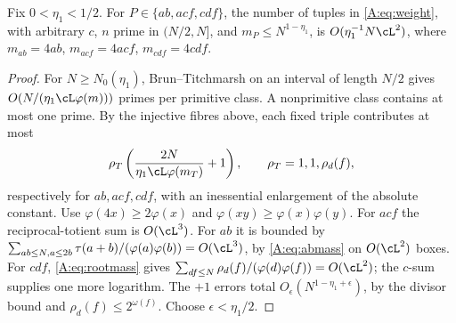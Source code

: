\begin{lemma}\label{L:8.2}
Fix $0<\eta_1<1/2$. For $P\in\{ab,acf,cdf\}$, the number of tuples
in \eqref{A:eq:weight}, with arbitrary $c$, $n$ prime in $(N/2,N]$, and
$m_P\le N^{1-\eta_1}$, is $O(\eta_1^{-1}N\cL^2)$, where
$m_{ab}=4ab$, $m_{acf}=4acf$, $m_{cdf}=4cdf$.
\end{lemma}
\begin{proof}
For $N\ge N_0(\eta_1)$, Brun--Titchmarsh \cite{MV} on an interval of
length $N/2$ gives $O(N/(\eta_1\cL\varphi(m)))$ primes per primitive
class. A nonprimitive class contains at most one prime. By the injective
fibres above, each fixed triple contributes at most
\[
 \rho_T\left(\frac{2N}{\eta_1\cL\varphi(m_T)}+1\right),
 \qquad \rho_T=1,1,\rho_d(f),
\]
respectively for $ab,acf,cdf$, with an inessential enlargement of the
absolute constant. Use $\varphi(4x)\ge2\varphi(x)$ and
$\varphi(xy)\ge\varphi(x)\varphi(y)$.
For $acf$ the reciprocal-totient sum is $O(\cL^3)$.
For $ab$ it is bounded by
$\sum_{ab\le N,a\le2b}\tau(a+b)/(\varphi(a)\varphi(b))=O(\cL^3)$,
by \eqref{A:eq:abmass} on $O(\cL^2)$ boxes.
For $cdf$, \eqref{A:eq:rootmass} gives
$\sum_{df\le N}\rho_d(f)/(\varphi(d)\varphi(f))=O(\cL^2)$;
the $c$-sum supplies one more logarithm.
The $+1$ errors total $O_\epsilon(N^{1-\eta_1+\epsilon})$, by the divisor
bound and $\rho_d(f)\le2^{\omega(f)}$. Choose $\epsilon<\eta_1/2$.
\end{proof}

